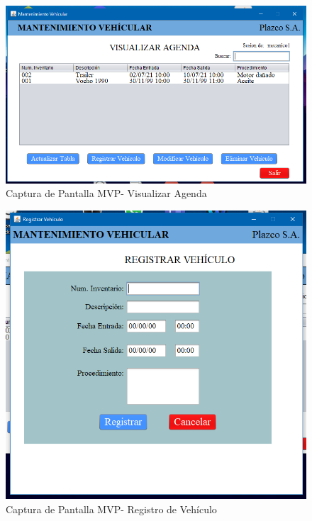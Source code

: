 \begin{figure}
	\centering
	\includegraphics[width=1\textwidth]{./apendice/imagenes/agenda}
	\caption{Captura de Pantalla MVP- Visualizar Agenda}
	\label{fig:Captura de Pantalla MVP- Visualizar Agenda}
\end{figure}

\begin{figure}
	\centering
	\includegraphics[width=1\textwidth]{./apendice/imagenes/registro}
	\caption{Captura de Pantalla MVP- Registro de Vehículo}
	\label{fig:Captura de Pantalla MVP- Registro de Vehiculo}
\end{figure}

